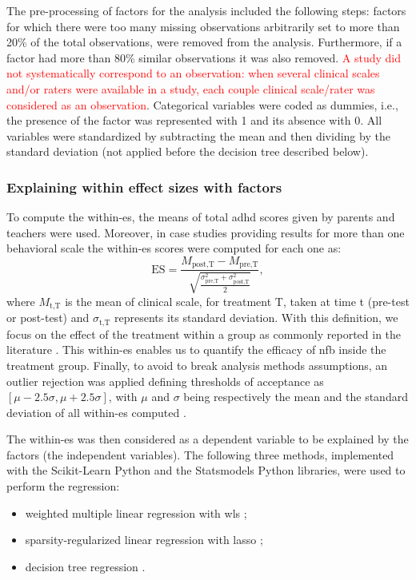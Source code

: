 The pre-processing of factors for the analysis included the following steps: factors for which there were too many 
missing observations arbitrarily set to more than 20\% of the total observations, were removed from the analysis. 
Furthermore, if a factor had more than 80\% similar observations it was also removed. 
\textcolor{red}{A study did not systematically correspond to an observation: when several clinical scales and/or raters were available in a study,
each couple clinical scale/rater was considered as an observation}.
Categorical variables were coded as dummies, i.e., the presence of the factor was represented with 1 and its absence with 0. All variables 
were standardized by subtracting the mean and then dividing by the standard deviation (not applied before the decision tree described below).

\subsubsection{Explaining within effect sizes with factors}

To compute the within-\gls{es}, the  means of total \gls{adhd} scores given by parents and teachers were used. Moreover, 
in case studies providing results for more than one behavioral scale the within-\gls{es} scores were computed for each one as:
\begin{equation*}
\label{eq:factors_effect_size_within_subject}
\text{ES} = \frac{M_{\text{post,T}} - M_{\text{pre,T}}}{\sqrt{\frac{\sigma_{\text{pre,T}}^2 + \sigma_{\text{post,T}}^2}{2}}},
\end{equation*} 
\noindent where $M_{\text{t,T}}$ is the mean of clinical scale, for treatment T, taken at time t (pre-test or post-test) and $\sigma_{\text{t,T}}$ represents 
its standard deviation. With this definition, we focus on the effect of the treatment within a group \citep{Cohen1988} as commonly reported 
in the literature \citep{Arns2009, Maurizio2014, Strehl2017}. This within-\gls{es} enables us to quantify 
the efficacy of \gls{nfb} inside the treatment group. 
Finally, to avoid to break analysis methods assumptions, an outlier rejection was applied defining thresholds of acceptance as 
$[\mu - 2.5 \sigma, \mu + 2.5 \sigma]$, with $\mu$ and $\sigma$ being respectively the mean and the standard deviation of all within-\gls{es} computed \citep{Shewhart1931}.

The within-\gls{es} was then considered as a dependent variable to be explained by the factors (the independent variables). 
The following three methods, implemented with the Scikit-Learn Python \citep[version 0.18.1]{Pedregosa2011} and the Statsmodels Python
\citep[version 0.8.0]{Seabold2010} libraries, were used to perform the regression:
\begin{itemize}
  \item weighted multiple linear regression with \gls{wls} \citep{Montgomery2012};
	\item sparsity-regularized linear regression with \gls{lasso} \citep{Tibshirani1996};
	\item decision tree regression \citep{Quinlan1986}.
\end{itemize}


